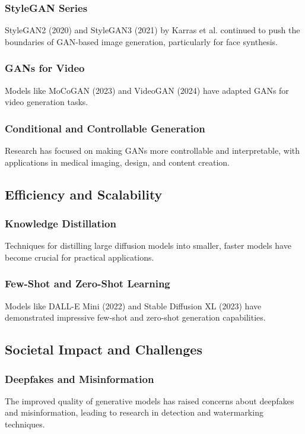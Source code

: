 \subsubsection*{StyleGAN Series}
StyleGAN2 (2020) and StyleGAN3 (2021) by Karras et al. continued to push the boundaries of GAN-based image generation, particularly for face synthesis.

\subsubsection*{GANs for Video}
Models like MoCoGAN (2023) and VideoGAN (2024) have adapted GANs for video generation tasks.

\subsubsection*{Conditional and Controllable Generation}
Research has focused on making GANs more controllable and interpretable, with applications in medical imaging, design, and content creation.

\subsection*{Efficiency and Scalability}

\subsubsection*{Knowledge Distillation}
Techniques for distilling large diffusion models into smaller, faster models have become crucial for practical applications.

\subsubsection*{Few-Shot and Zero-Shot Learning}
Models like DALL-E Mini (2022) and Stable Diffusion XL (2023) have demonstrated impressive few-shot and zero-shot generation capabilities.

\subsection*{Societal Impact and Challenges}

\subsubsection*{Deepfakes and Misinformation}
The improved quality of generative models has raised concerns about deepfakes and misinformation, leading to research in detection and watermarking techniques.

